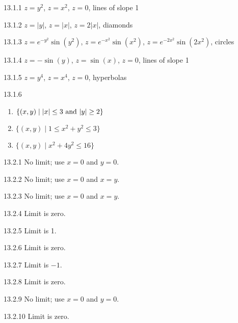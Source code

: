 \begin{Answer}{13.1.1}
$z=y^2$, $z=x^2$, $z=0$, lines of slope 1
\end{Answer}
\begin{Answer}{13.1.2}
$z=|y|$, $z=|x|$, $z=2|x|$, diamonds
\end{Answer}
\begin{Answer}{13.1.3}
$z=e^{-y^2}\sin(y^2)$, $z=e^{-x^2}\sin(x^2)$,
$z=e^{-2x^2}\sin(2x^2)$, circles
\end{Answer}
\begin{Answer}{13.1.4}
$z=-\sin(y)$, $z=\sin(x)$,
$z=0$, lines of slope 1
\end{Answer}
\begin{Answer}{13.1.5}
$z=y^4$, $z=x^4$,
$z=0$, hyperbolas
\end{Answer}
\begin{Answer}{13.1.6}
\begin{enumerate}
	\item	$\{(x,y)\mid |x|\le3\ \hbox{and}\ |y|\ge2\}$
	\item	$\{(x,y)\mid 1\le x^2+y^2\le3\}$
	\item	$\{(x,y)\mid x^2+4y^2\le16\}$
\end{enumerate}
\end{Answer}
\begin{Answer}{13.2.1}
No limit; use $x=0$ and $y=0$.
\end{Answer}
\begin{Answer}{13.2.2}
No limit; use $x=0$ and $x=y$.
\end{Answer}
\begin{Answer}{13.2.3}
No limit; use $x=0$ and $x=y$.
\end{Answer}
\begin{Answer}{13.2.4}
Limit is zero.
\end{Answer}
\begin{Answer}{13.2.5}
Limit is 1.
\end{Answer}
\begin{Answer}{13.2.6}
Limit is zero.
\end{Answer}
\begin{Answer}{13.2.7}
Limit is $-1$.
\end{Answer}
\begin{Answer}{13.2.8}
Limit is zero.
\end{Answer}
\begin{Answer}{13.2.9}
No limit; use $x=0$ and $y=0$.
\end{Answer}
\begin{Answer}{13.2.10}
Limit is zero.
\end{Answer}
